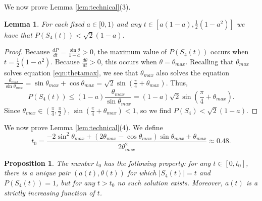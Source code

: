\documentclass[leqno]{article}
\numberwithin{equation}{section}
\theoremstyle{definition}
\theoremstyle{remark}
\theoremstyle{plain}
\newtheorem{lemma}[equation]{Lemma}
\newtheorem{proposition}[equation]{Proposition}
\begin{document}
We now prove Lemma \ref{lem:technical}(3).

\begin{lemma}\label{lem:PLmax}For each fixed $a\in [0,1)$ and any $t\in\left[a(1-a), \frac{1}{2}(1-a^2)\right]$ we have that $P(S_4(t)) < \sqrt{2}(1-a)$. 

\end{lemma}

\begin{proof}Because $\frac{dP}{dt} = \frac{\sin\theta}{1-a} > 0$, the maximum value of $P(S_4(t))$ occurs when $t = \frac{1}{2}(1-a^2)$.  Because $\frac{d\theta}{dt} > 0$, this occurs when $\theta = \theta_{max}$.  Recalling that $\theta_{max}$ solves equation \eqref{eqn:thetamax}, we see that $\theta_{max}$ also solves the equation $\frac{\theta_{max}}{\sin\theta_{max}} = \sin\theta_{max} + \cos\theta_{max} = \sqrt{2}\sin\left(\tfrac{\pi}{4} + \theta_{max}\right)$.  Thus, $$P(S_4(t)) \leq (1-a) \frac{\theta_{max}}{\sin\theta_{max}}  = (1-a) \sqrt{2}\sin\left(\frac{\pi}{4} + \theta_{max}\right).$$  Since $\theta_{max}\in (\tfrac{\pi}{4},\tfrac{\pi}{2})$, $\sin(\tfrac{\pi}{4} + \theta_{max}) < 1$, so we find $P(S_4) < \sqrt{2}(1-a)$.

\end{proof}

We now prove Lemma \ref{lem:technical}(4).  We define $$t_0 = \frac{-2 \sin^2\theta_{max}+\left(2 \theta_{max} -\cos\theta_{max}\right) \sin\theta_{max}+\theta_{max}}{2 \theta_{max}^{2}}\approx 0.48.$$

\begin{proposition}\label{prop:uniquea} The number $t_0$ has the following property:  for any $t\in [0,t_0]$, there is a unique pair $(a(t),\theta(t))$ for which $|S_4(t)| = t$ and $P(S_4(t)) = 1$, but for any $t > t_0$ no such solution exists.  Moreover, $a(t)$ is a strictly increasing function of $t$. 

\end{proposition}
\end{document}
